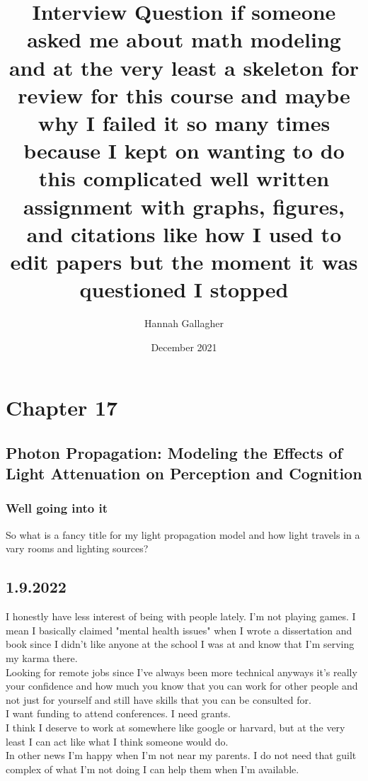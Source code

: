 \chapter{Chapter 17}
\section{Photon Propagation: Modeling the Effects of Light Attenuation on Perception and Cognition}
\subsection{Well going into it}
So what is a fancy title for my light propagation model and how light travels in a vary rooms and lighting sources?  \\ 
\section{1.9.2022}
I honestly have less interest of being with people lately. I'm not playing games. I mean I basically claimed "mental health issues" when I wrote a dissertation and book since I didn't like anyone at the school I was at and know that I'm serving my karma there.
\\
Looking for remote jobs since I've always been more technical anyways it's really your confidence and how much you know that you can work for other people and not just for yourself and still have skills that you can be consulted for. 
\\ 
I want funding to attend conferences. I need grants. \\
I think I deserve to work at somewhere like google or harvard, but at the very least I can act like what I think someone would do. 
\\ 
In other news I'm happy when I'm not near my parents. I do not need that guilt complex of what I'm not doing I can help them when I'm available. 



\title{Interview Question if someone asked me about math modeling and at the very least a skeleton for review for this course and maybe why I failed it so many times because I kept on wanting to do this complicated well written assignment with graphs, figures, and citations like how I used to edit papers but the moment it was questioned I stopped }
\author{Hannah Gallagher}
\date{December 2021}


\maketitle

